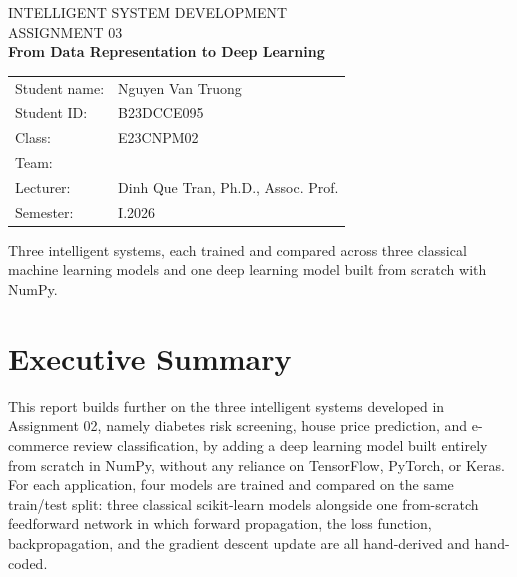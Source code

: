 \documentclass[11pt]{article}
\begin{document}
\begin{titlepage}
\centering
\vspace*{2cm}
{\Large INTELLIGENT SYSTEM DEVELOPMENT}\\[0.3cm]
{\Large ASSIGNMENT 03}\\[0.5cm]
{\huge \bfseries From Data Representation to Deep Learning}\\[2cm]

\begin{tabular}{ll}
Student name: & Nguyen Van Truong \\[0.5cm]
Student ID: & B23DCCE095 \\[0.5cm]
Class: & E23CNPM02 \\[0.5cm]
Team: & \underline{\hspace{7cm}} \\[0.5cm]
Lecturer: & Dinh Que Tran, Ph.D., Assoc. Prof. \\[0.5cm]
Semester: & I.2026 \\
\end{tabular}

\vfill
{\large Three intelligent systems, each trained and compared across three classical
machine learning models and one deep learning model built from scratch with NumPy.}
\end{titlepage}

\tableofcontents
\newpage

\section{Executive Summary}

This report builds further on the three intelligent systems developed in Assignment 02,
namely diabetes risk screening, house price prediction, and e-commerce review
classification, by adding a deep learning model built entirely from scratch in NumPy,
without any reliance on TensorFlow, PyTorch, or Keras. For each application, four models
are trained and compared on the same train/test split: three classical scikit-learn
models alongside one from-scratch feedforward network in which forward propagation, the
loss function, backpropagation, and the gradient descent update are all hand-derived and
hand-coded.
\end{document}
